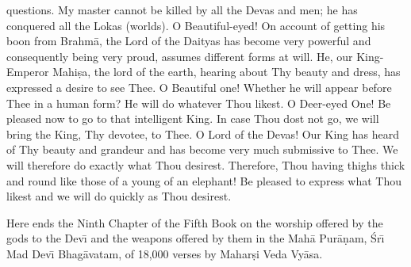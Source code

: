 questions. My master cannot be killed by all the Devas and men; he has conquered all the Lokas (worlds). O Beautiful-eyed! On account of getting his boon from Brahm\=a, the Lord of the Daityas has become very powerful and consequently being very proud, assumes different forms at will. He, our King-Emperor Mahi\d{s}a, the lord of the earth, hearing about Thy beauty and dress, has expressed a desire to see Thee. O Beautiful one! Whether he will appear before Thee in a human form? He will do whatever Thou likest. O Deer-eyed One! Be pleased now to go to that intelligent King. In case Thou dost not go, we will bring the King, Thy devotee, to Thee. O Lord of the Devas! Our King has heard of Thy beauty and grandeur and has become very much submissive to Thee. We will therefore do exactly what Thou desirest. Therefore, Thou having thighs thick and round like those of a young of an elephant! Be pleased to express what Thou likest and we will do quickly as Thou
desirest.

Here ends the Ninth Chapter of the Fifth Book on the worship offered by the gods to the Dev\={\i} and the weapons offered by them in the Mah\=a Pur\=a\d{n}am, \'Sr\={\i} Mad Dev\={\i} Bhag\=avatam, of 18,000 verses by Mahar\d{s}i Veda Vy\=asa.



